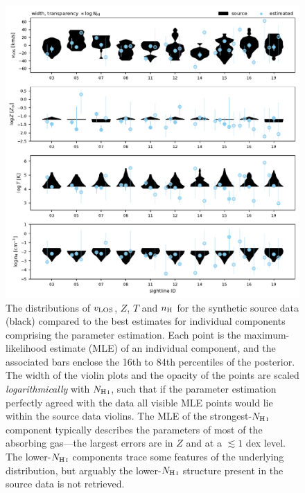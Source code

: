 \documentclass[fleqn,usenatbib]{mnras}
\begin{document}
\begin{figure}
    \centering
    \includegraphics[width=\textwidth]{figures/sample2/violin_vs_components_rerun.pdf}
    \caption{
    The distributions of $v_{\rm LOS}$, $Z$, $T$ and $n_{\rm H}$ for the synthetic source data (black) compared to the best estimates for individual components comprising the parameter estimation.
    Each point is the maximum-likelihood estimate (MLE) of an individual component,
    and the associated bars enclose the 16th to 84th percentiles of the posterior.
    The width of the violin plots and the opacity of the points are scaled \textit{logarithmically} with $N_{\ion{H}{I}}$,
    such that if the parameter estimation perfectly agreed with the data all visible MLE points would lie within the source data violins.
    The MLE of the strongest-$N_{\ion{H}{I}}$ component typically describes the parameters of most of the absorbing gas---the largest errors are in $Z$ and at a $\lesssim 1$ dex level.
    The lower-$N_{\ion{H}{I}}$ components trace some features of the underlying distribution,
    but arguably the lower-$N_{\ion{H}{I}}$ structure present in the source data is not retrieved.
    }
    \label{f: sample2 violin vs components}
\end{figure}
\end{document}
